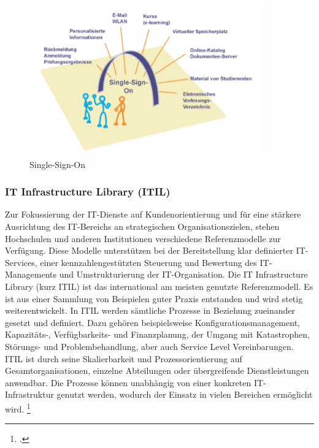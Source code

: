 \begin{figure}[h!]
	\centering
	\includegraphics[width=10cm]{kapitel/gruppe1_2/bilder/SSO}
	\caption{Single-Sign-On\protect\footnotemark}
	\label{fig_sso}
\end{figure}


\subsubsection{IT Infrastructure Library (ITIL)}
\label{subsubsection_ITIL}
Zur Fokussierung der IT-Dienste auf Kundenorientierung und für eine stärkere Ausrichtung des IT-Bereichs an strategischen Organisationszielen, stehen Hochschulen und anderen Institutionen verschiedene Referenzmodelle zur Verfügung. Diese Modelle unterstützen bei der Bereitstellung klar definierter IT-Services, einer kennzahlengestützten Steuerung und Bewertung des IT-Managements und Umstrukturierung der IT-Organisation. Die IT Infrastructure Library (kurz ITIL) ist das international am meisten genutzte Referenzmodell. Es ist aus einer Sammlung von Beispielen guter Praxis entstanden und wird stetig weiterentwickelt. In ITIL werden sämtliche Prozesse in Beziehung zueinander gesetzt und definiert. Dazu gehören beispielsweise Konfigurationsmanagement, Kapazitäts-, Verfügbarkeits- und Finanzplanung, der Umgang mit Katastrophen, Störungs- und Problembehandlung, aber auch Service Level Vereinbarungen. ITIL ist durch seine Skalierbarkeit und Prozessorientierung auf Gesamtorganisationen, einzelne Abteilungen oder übergreifende Dienstleistungen anwendbar. Die Prozesse können unabhängig von einer konkreten IT-Infrastruktur genutzt werden, wodurch der Einsatz in vielen Bereichen ermöglicht wird. \footcite[Vgl.][34]{leitner_itil_2008}

